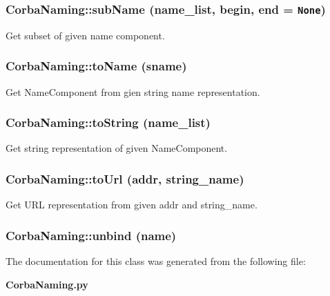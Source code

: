 \subsubsection{\setlength{\rightskip}{0pt plus 5cm}Corba\-Naming::sub\-Name (name\_\-list, begin, end = {\tt None})}\label{classCorbaNaming_CorbaNaminga31}


Get subset of given name component. 

\subsubsection{\setlength{\rightskip}{0pt plus 5cm}Corba\-Naming::to\-Name (sname)}\label{classCorbaNaming_CorbaNaminga22}


Get Name\-Component from gien string name representation. 

\subsubsection{\setlength{\rightskip}{0pt plus 5cm}Corba\-Naming::to\-String (name\_\-list)}\label{classCorbaNaming_CorbaNaminga21}


Get string representation of given Name\-Component. 

\subsubsection{\setlength{\rightskip}{0pt plus 5cm}Corba\-Naming::to\-Url (addr, string\_\-name)}\label{classCorbaNaming_CorbaNaminga23}


Get URL representation from given addr and string\_\-name. 

\subsubsection{\setlength{\rightskip}{0pt plus 5cm}Corba\-Naming::unbind (name)}\label{classCorbaNaming_CorbaNaminga14}




The documentation for this class was generated from the following file:\begin{CompactItemize}
\item 
{\bf Corba\-Naming.py}\end{CompactItemize}
